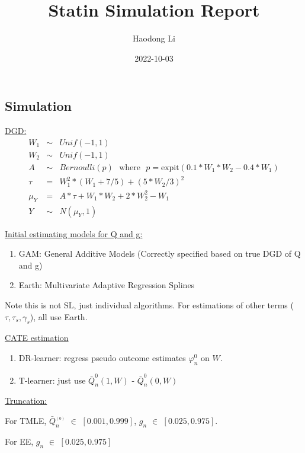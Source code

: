 \documentclass[
]{article}
\title{Statin Simulation Report}
\author{Haodong Li}
\date{2022-10-03}
\begin{document}
\maketitle

\hypertarget{simulation}{%
\subsection{Simulation}\label{simulation}}

\underline{DGD:} \begin{eqnarray*}
W_{1} &\sim& Unif(-1, 1)\\[1pt]
W_{2} &\sim& Unif(-1, 1)\\[1pt]
A &\sim& Bernoulli(p) \mbox{~~where~~} p = \mbox{expit}(0.1*W_1*W_2-0.4*W_1) \\[1pt]
\tau &=& W_1^2*(W_1+7/5) + (5*W_2/3)^2\\[1pt]
\mu_{Y} &=& A*\tau + W_1*W_2 + 2*W_2^2 - W_1 \\[1pt]
Y &\sim& N(\mu_{Y}, 1)
\end{eqnarray*}

\underline{Initial estimating models for Q and g:}

\begin{enumerate}
\def\labelenumi{\arabic{enumi})}
\item
  GAM: General Additive Models (Correctly specified based on true DGD of
  Q and g)
\item
  Earth: Multivariate Adaptive Regression Splines
\end{enumerate}

Note this is not SL, just individual algorithms. For estimations of
other terms (\(\tau,\tau_s,\gamma_s\)), all use Earth.

\underline{CATE estimation}

\begin{enumerate}
\def\labelenumi{\arabic{enumi})}
\item
  DR-learner: regress pseudo outcome estimates \(\varphi_n^0\) on \(W\).
\item
  T-learner: just use \(\bar{Q}_n^0(1,W)\) - \(\bar{Q}_n^0(0,W)\)
\end{enumerate}

\underline{Truncation:}

For TMLE, \(\bar{Q}_n^{_{(0)}}\) \(\in\) \([0.001, 0.999]\), \(g_n\)
\(\in\) \([0.025, 0.975]\).

For EE, \(g_n\) \(\in\) \([0.025, 0.975]\)
\end{document}
